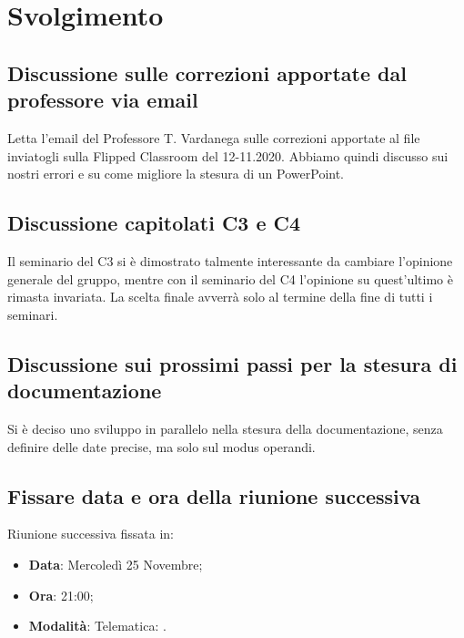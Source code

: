 \documentclass[]{article}
\begin{document}
	\newpage

	\section{Svolgimento}
		\subsection{Discussione sulle correzioni apportate dal professore via email}
		Letta l'email del Professore T. Vardanega sulle correzioni apportate al file inviatogli sulla Flipped Classroom del 12-11.2020.
		Abbiamo quindi discusso sui nostri errori e su come migliore la stesura di un PowerPoint.\\
		
		\subsection{Discussione capitolati C3 e C4}
		Il seminario del  C3 si è dimostrato talmente interessante da cambiare l'opinione generale del gruppo, mentre con il seminario del  C4 l'opinione su quest'ultimo è rimasta invariata. La scelta finale avverrà solo al termine della fine di tutti i seminari.\\
		
		\subsection{Discussione sui prossimi passi per la stesura di documentazione}
		Si è deciso uno sviluppo in parallelo nella stesura della documentazione, senza definire delle date precise, ma solo sul modus operandi.\\
		
		\subsection{Fissare data e ora della riunione successiva}
		Riunione successiva fissata in:
		\begin{itemize}
			\item \textbf{Data}: Mercoledì 25 Novembre;
			\item \textbf{Ora}: 21:00;
			\item \textbf{Modalità}: Telematica: .
		\end{itemize}
	
\end{document}
